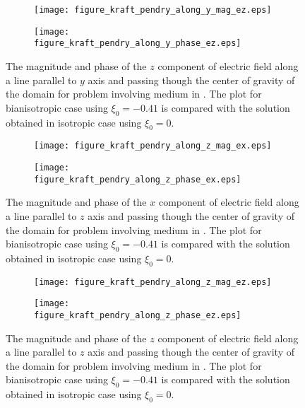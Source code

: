 \begin{figure}[H]
\centering
\begin{subfigure}[b]{0.49\textwidth}
\texttt{[image: figure\_kraft\_pendry\_along\_y\_mag\_ez.eps]}
\end{subfigure}
%
\begin{subfigure}[b]{0.49\textwidth}
\centering
\texttt{[image: figure\_kraft\_pendry\_along\_y\_phase\_ez.eps]}
\end{subfigure}
\caption{The magnitude and phase of the $z$ component of electric field along a line parallel to $y$ axis 
and passing though the center of gravity of the domain  for problem involving 
medium in \cite{pendry2016acsphotonics}. 
The plot for bianisotropic case using $\xi_0 = -0.41$ is compared with 
the solution obtained in isotropic case using $\xi_0 = 0$. }
\label{fi:kraft_pendry_ez_vs_y}
\end{figure}

\begin{figure}[H]
\centering
\begin{subfigure}[b]{0.49\textwidth}
\texttt{[image: figure\_kraft\_pendry\_along\_z\_mag\_ex.eps]}
\end{subfigure}
%
\begin{subfigure}[b]{0.49\textwidth}
\centering
\texttt{[image: figure\_kraft\_pendry\_along\_z\_phase\_ex.eps]}
\end{subfigure}
\caption{The magnitude and phase of the $x$ component of electric field along a line parallel to $z$ axis 
and passing though the center of gravity of the domain for problem involving 
medium in \cite{pendry2016acsphotonics}. 
The plot for bianisotropic case using $\xi_0 = -0.41$ is compared with 
the solution obtained in isotropic case using $\xi_0 = 0$.}
\label{fi:kraft_pendry_ex_vs_z}
\end{figure}

\begin{figure}[H]
\centering
\begin{subfigure}[b]{0.49\textwidth}
\texttt{[image: figure\_kraft\_pendry\_along\_z\_mag\_ez.eps]}
\end{subfigure}
%
\begin{subfigure}[b]{0.49\textwidth}
\centering
\texttt{[image: figure\_kraft\_pendry\_along\_z\_phase\_ez.eps]}
\end{subfigure}
\caption{The magnitude and phase of the $z$ component of electric field along a line parallel to $z$ axis 
and passing though the center of gravity of the domain  for problem involving 
medium in \cite{pendry2016acsphotonics}. 
The plot for bianisotropic case using $\xi_0 = -0.41$ is compared with 
the solution obtained in isotropic case using $\xi_0 = 0$.}
\label{fi:kraft_pendry_ez_vs_z}
\end{figure}
